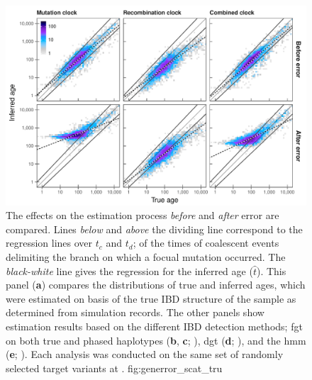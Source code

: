 

\begin{figure}[tb]
{\small{}} \\
\includegraphics[width=\textwidth]{./img/ch5/generror_scat_tru}
{The effects on the estimation process \emph{before} and \emph{after} error are compared.
Lines \emph{below} and \emph{above} the dividing line correspond to the regression lines over $t_c$ and $t_d$; \ie of the times of coalescent events delimiting the branch on which a focual mutation occurred.
The \emph{black-white} line gives the regression for the inferred age ($\hat{t}$).
This panel (\textbf{a}) compares the distributions of true and inferred ages, which were estimated on basis of the true IBD structure of the sample as determined from simulation records.
The other panels show estimation results based on the different IBD detection methods;
\gls{fgt} on both true and phased haplotypes (\textbf{b}, \textbf{c}; ),
\gls{dgt} (\textbf{d}; ),
and the  \gls{hmm} (\textbf{e}; ).
Each analysis was conducted on the same set of  randomly selected target variants at \fk{[2,25]}.}
{fig:generror_scat_tru}
\end{figure}
